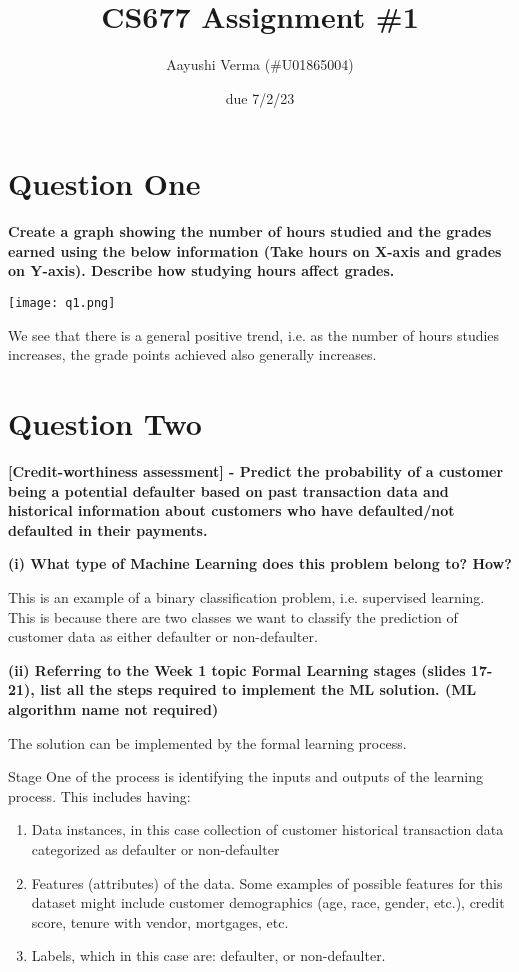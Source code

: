 \documentclass{article}
\title{CS677 Assignment \#1}
\author{Aayushi Verma (\#U01865004)}
\date{due 7/2/23}
\begin{document}
\maketitle

\section{Question One}
\noindent \textbf{Create a graph showing the number of hours studied and the grades earned using the below information (Take hours on X-axis and grades on Y-axis). Describe how studying hours affect grades.}

\texttt{[image: q1.png]}

We see that there is a general positive trend, i.e. as the number of hours studies increases, the grade points achieved also generally increases.

\section{Question Two}
\noindent \textbf{[Credit-worthiness assessment] - Predict the probability of a customer being a potential defaulter based on past transaction data and historical information about customers who have defaulted/not defaulted in their payments.}
\newline

\noindent \textbf{(i) What type of Machine Learning does this problem belong to? How?}

This is an example of a binary classification problem, i.e. supervised learning. This is because there are two classes we want to classify the prediction of customer data as either defaulter or non-defaulter.
\newline

\noindent \textbf{(ii) Referring to the Week 1 topic Formal Learning stages (slides 17-21), list all the steps required to implement the ML solution. (ML algorithm name
not required)}

The solution can be implemented by the formal learning process.

Stage One  of the process is identifying the inputs and outputs of the learning process. This includes having:
\begin{enumerate}
    \item Data instances, in this case collection of customer historical transaction data categorized as defaulter or non-defaulter
    \item Features (attributes) of the data. Some examples of possible features for this dataset might include customer demographics (age, race, gender, etc.), credit score, tenure with vendor, mortgages, etc.
    \item Labels, which in this case are: defaulter, or non-defaulter.
\end{enumerate}
\end{document}
